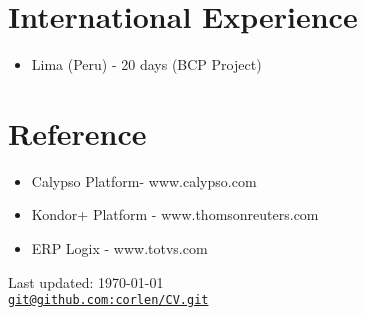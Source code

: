 \documentclass[letterpaper]{article}
\makeatletter
\def\footerlink{git@github.com:corlen/CV.git}
\makeatother
\begin{document}
\section*{International Experience}
\begin{itemize}
  \item Lima (Peru) - 20 days (BCP Project)
\end{itemize}

\bigskip

\section*{Reference}

\begin{itemize}
\item Calypso Platform- www.calypso.com
\item Kondor+ Platform - www.thomsonreuters.com
\item ERP Logix - www.totvs.com
\end{itemize}

\bigskip

\begin{center}
  \begin{footnotesize}
    Last updated: \today \\
    \href{\footerlink}{\texttt{\footerlink}}
  \end{footnotesize}
\end{center}
\end{document}
